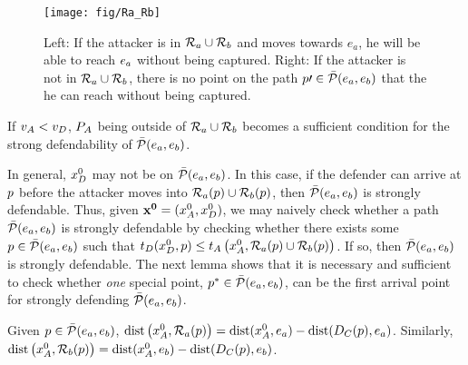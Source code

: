 \begin{figure}
\centering
\texttt{[image: fig/Ra\_Rb]}
\caption{Left: If the attacker is in $\mathcal{R}_a\cup\mathcal{R}_b$ and moves towards $e_a$, he  will be able to reach $e_a$ without being captured. Right: If the attacker is not in $\mathcal{R}_a\cup\mathcal{R}_b$, there is no point on the path $p\prime\in\bar{\mathcal{P}}(e_a,e_b)$ that the he can reach without being captured.}
\label{fig:lemma1}
\end{figure}

If $v_A<v_D$, $P_A$ being outside of $\mathcal{R}_a \cup \mathcal{R}_b$ becomes a sufficient condition for the strong defendability of $\bar{\mathcal{P}}(e_a,e_b)$.

In general, $x_D^0$ may not be on $\bar{\mathcal{P}}(e_a,e_b)$. In this case, if the defender can arrive at $p$ before the attacker moves into $\mathcal{R}_a(p)\cup\mathcal{R}_b(p)$, then $\bar{\mathcal{P}}(e_a,e_b)$ is strongly defendable. Thus, given $\mathbf{x^0} = (x_A^0,x_D^0)$, we may naively check whether a path $\bar{\mathcal{P}}(e_a,e_b)$ is strongly defendable by checking whether there exists some $p\in\bar{\mathcal{P}}(e_a,e_b)$ such that $t_D(x_D^0, p)\le t_A\left(x_A^0,\mathcal{R}_a(p)\cup\mathcal{R}_b(p)\right)$. If so, then $\bar{\mathcal{P}}(e_a,e_b)$ is strongly defendable. The next lemma shows that it is necessary and sufficient to check whether \textit{one} special point, $p^*\in\bar{\mathcal{P}}(e_a,e_b)$, can be the first arrival point for strongly defending $\bar{\mathcal{P}}(e_a,e_b)$.

\begin{rem} \label{rem:time_to_region_a}
Given $p\in\bar{\mathcal{P}}(e_a,e_b)$, $\text{dist}\left(x_A^0,\mathcal{R}_a(p)\right) = \text{dist}(x_A^0,e_a) - \text{dist}(D_C(p),e_a)$. Similarly, $\text{dist}\left(x_A^0,\mathcal{R}_b(p)\right) = \text{dist}(x_A^0,e_b) - \text{dist}(D_C(p),e_b)$.
\end{rem}

